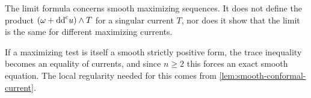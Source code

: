 The limit formula concerns smooth maximizing sequences. It does not define the product $(\omega+\mathrm{dd}^{\mathrm{c}} u)\wedge T$ for a singular current $T$, nor does it show that the limit is the same for different maximizing currents.

If a maximizing test is itself a smooth strictly positive form, the trace inequality becomes an equality of currents, and since $n\geq2$ this forces an exact smooth equation. The local regularity needed for this comes from \cref{lem:smooth-conformal-current}.
























